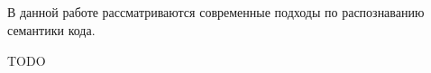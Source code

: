 \subsection*{}
В данной работе рассматриваются современные подходы по распознаванию семантики кода. 

TODO
\newpage
